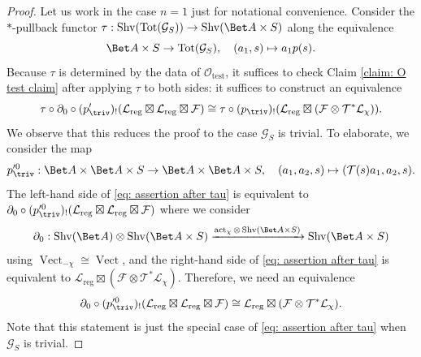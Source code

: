 \documentclass[10pt]{amsart}
\theoremstyle{remark}
\newcommand{\pa}{\partial}
\newcommand{\on}{\operatorname}
\newcommand{\cF}{\mathcal{F}}
\newcommand{\cG}{\mathcal{G}}
\newcommand{\cL}{\mathcal{L}}
\newcommand{\cO}{\mathcal{O}}
\newcommand{\cT}{\mathcal{T}}
\newcommand{\Vect}{\on{Vect}}
\newcommand{\Shv}{\on{Shv}}
\begin{document}
\begin{proof}
    Let us work in the case $n=1$ just for notational convenience.
Consider the $*$-pullback functor $\tau:\Shv(\on{Tot}(\cG_S))\rightarrow\Shv(\Bet A\times S)$ along the equivalence
\[\Bet A\times S\rightarrow \on{Tot}(\cG_S),\quad (a_1,s)\mapsto  a_1 p(s).\]
Because $\tau$ is determined by the data of $\cO_{\on{test}}$, it suffices to check Claim \ref{claim: O test claim} after applying $\tau$ to both sides: it suffices to construct an equivalence
\begin{equation}\label{eq: assertion after tau}
    \tau \circ\pa_0\circ (p'_{\triv})_!(\cL_{\on{reg}}\boxtimes\cL_{\on{reg}}\boxtimes \cF)\cong \tau\circ (p_{\triv})_!(\cL_{\on{reg}}\boxtimes (\cF\otimes \cT^*\cL_{\chi})).
\end{equation}
We observe that this reduces the proof to the case $\cG_S$ is trivial. To elaborate, we consider the map
\[p'^0_{\triv}: \Bet A\times \Bet A \times S\rightarrow \Bet A\times \Bet A\times S,\quad (a_1, a_2, s)\mapsto (\cT(s)a_1, a_2, s).\]
The left-hand side of \eqref{eq: assertion after tau} is equivalent to $\pa_0\circ (p'^0_{\triv})_!(\cL_{\on{reg}}\boxtimes \cL_{\on{reg}}\boxtimes \cF)$ where we consider
\[\pa_0: \Shv(\Bet A)\otimes \Shv(\Bet A\times S)\xrightarrow{\on{act}_{\chi}\otimes \Shv(\Bet A\times S)}\Shv(\Bet A\times S)\]
using $\Vect_{-\chi}\cong \Vect$, and the right-hand side of \eqref{eq: assertion after tau} is equivalent to $\cL_{\on{reg}}\boxtimes (\cF\otimes\cT^*\cL_{\chi})$. Therefore, we need an equivalence
\begin{equation}\label{eq: equiv after reduction to triv}
    \pa_0\circ (p'^0_{\triv})_!(\cL_{\on{reg}}\boxtimes \cL_{\on{reg}}\boxtimes \cF)\cong \cL_{\on{reg}}\boxtimes (\cF\otimes\cT^*\cL_{\chi}).
\end{equation}
Note that this statement is just the special case of \eqref{eq: assertion after tau} when $\cG_S$ is trivial. 
\medskip


\end{proof}
\end{document}
